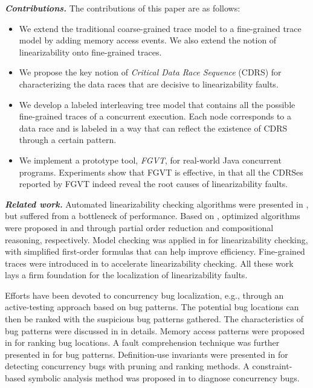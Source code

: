\documentclass[runningheads]{llncs}
\begin{document}
\noindent\textbf{\textit{Contributions.}}
The contributions of this paper are as follows:
\begin{itemize}
  \item We extend the traditional coarse-grained trace model to a fine-grained trace model by adding memory access events. We also extend the notion of linearizability onto fine-grained traces.
  \item We propose the key notion of \textit{Critical Data Race Sequence} (CDRS) for characterizing the data races that are decisive to linearizability faults.
  \item We develop a labeled interleaving tree model that contains all the possible fine-grained traces of a concurrent execution. Each node corresponds to a data race and is labeled in a way that can reflect the existence of CDRS through a certain pattern.
  \item We implement a prototype tool, \textit{FGVT}, for real-world Java concurrent programs. Experiments show that FGVT is effective, in that all the CDRSes reported by FGVT indeed reveal the root causes of linearizability faults.
\end{itemize}

\noindent\textbf{\textit{Related work.}} Automated linearizability checking algorithms were presented in \cite{DBLP:conf/pldi/BurckhardtDMT10,DBLP:journals/jpdc/WingG93}, but suffered from a bottleneck of performance. Based on \cite{DBLP:journals/jpdc/WingG93}, optimized algorithms were proposed in \cite{DBLP:journals/concurrency/Lowe17} and \cite{DBLP:conf/forte/HornK15a} through partial order reduction and compositional reasoning, respectively. Model checking was applied in \cite{DBLP:conf/popl/BouajjaniEEH15,DBLP:conf/pldi/EmmiEH15} for linearizability checking, with simplified first-order formulas that can help improve efficiency. Fine-grained traces were introduced in \cite{DBLP:conf/sac/LongZ16} to accelerate linearizability checking. All these work lays a firm foundation for the localization of linearizability faults.

Efforts have been devoted to concurrency bug localization, e.g., through an active-testing approach based on bug patterns. The potential bug locations can then be ranked with the suspicious bug patterns gathered. The characteristics of bug patterns were discussed in \cite{DBLP:conf/asplos/LuPSZ08,DBLP:conf/ipps/FarchiNU03} in details. Memory access patterns were proposed in \cite{DBLP:conf/icse/ParkVH10,DBLP:conf/icst/ParkVH12,DBLP:conf/icsm/LiuQWM14} for ranking bug locations. A fault comprehension technique was further presented in \cite{DBLP:conf/icse/Park04} for bug patterns. Definition-use invariants were presented in \cite{DBLP:conf/oopsla/ShiPYLZCZ10} for detecting concurrency bugs with pruning and ranking methods. A constraint-based symbolic analysis method was proposed in \cite{DBLP:conf/issta/KhoshnoodKW15} to diagnose concurrency bugs.
\end{document}
